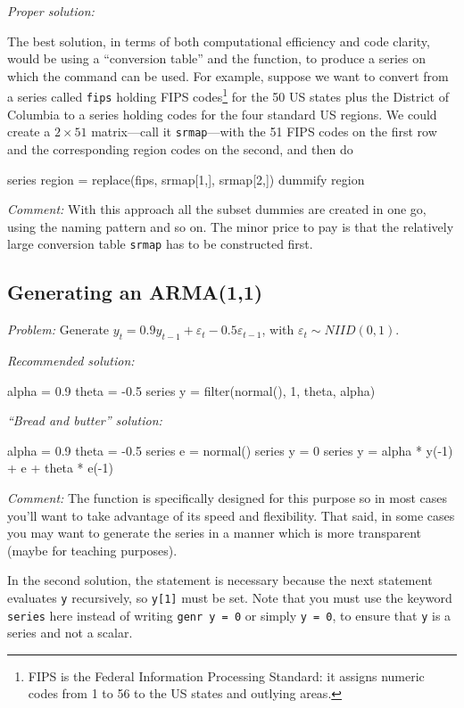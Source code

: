 \emph{Proper solution:}

The best solution, in terms of both computational efficiency and code
clarity, would be using a ``conversion table'' and the 
function, to produce a series on which the  command can
be used. For example, suppose we want to convert from a series called
\texttt{fips} holding FIPS codes\footnote{FIPS is the Federal
  Information Processing Standard: it assigns numeric codes from 1 to
  56 to the US states and outlying areas.} for the 50 US states plus
the District of Columbia to a series holding codes for the four
standard US regions. We could create a $2 \times 51$ matrix---call it
\texttt{srmap}---with the 51 FIPS codes on the first row and the
corresponding region codes on the second, and then do
\begin{code}
series region = replace(fips, srmap[1,], srmap[2,])
dummify region
\end{code}

\emph{Comment:} With this approach all the subset dummies are created
in one go, using the naming pattern  and so on. The
minor price to pay is that the relatively large conversion table
\texttt{srmap} has to be constructed first.

\subsection{Generating an ARMA(1,1)}

\emph{Problem:} Generate $y_t = 0.9 y_{t-1} + \varepsilon_t - 0.5
\varepsilon_{t-1}$, with $\varepsilon_t \sim N\!I\!I\!D(0,1)$.

\emph{Recommended solution:}
\begin{code}
alpha = 0.9
theta = -0.5
series y = filter(normal(), {1, theta}, alpha)
\end{code}

\emph{``Bread and butter'' solution:}
\begin{code}
alpha = 0.9
theta = -0.5
series e = normal()
series y = 0
series y = alpha * y(-1) + e + theta * e(-1)
\end{code}

\emph{Comment:} The  function is specifically designed for
this purpose so in most cases you'll want to take advantage of its
speed and flexibility. That said, in some cases you may want to
generate the series in a manner which is more transparent (maybe for
teaching purposes).

In the second solution, the statement  is necessary
because the next statement evaluates \texttt{y} recursively, so
\texttt{y[1]} must be set.  Note that you must use the keyword
\texttt{series} here instead of writing \texttt{genr y = 0} or simply
\texttt{y = 0}, to ensure that \texttt{y} is a series and
not a scalar.

